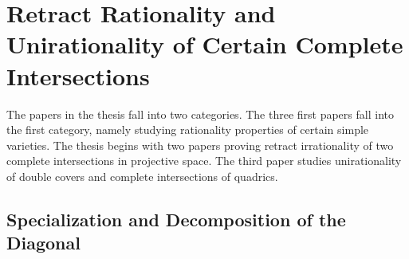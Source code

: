 \section{Retract Rationality and Unirationality of Certain Complete Intersections}
The papers in the thesis fall into two categories. The three first papers fall into the first category, namely studying rationality properties of certain simple varieties. The thesis begins with two papers proving retract irrationality of two complete intersections in projective space. The third paper studies unirationality of double covers and complete intersections of quadrics.

\subsection{Specialization and Decomposition of the Diagonal}

